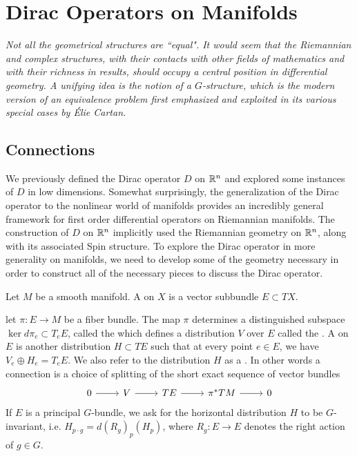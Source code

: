\chapter{Dirac Operators on Manifolds}
%
\subsectionend $ $\\
%
\emph{Not all the geometrical structures are ``equal". It would seem that the
 Riemannian and complex structures, with their contacts with other fields of
 mathematics and with their richness in results, should occupy a central position
 in differential geometry. A unifying idea is the notion of a $G$-structure, which
 is the modern version of an equivalence problem first emphasized and exploited
 in its various special cases by \'Elie Cartan.} \\
%
%
\subsectionend
%
\section{Connections}
%
We previously defined the Dirac operator $D$ on $\mathbb{R}^n$ and explored some
instances of $D$ in low dimensions. Somewhat surprisingly, the generalization
of the Dirac operator to the nonlinear world of manifolds provides an incredibly
general framework for first order differential operators on Riemannian manifolds.
The construction of $D$ on $\mathbb{R}^n$ implicitly used the
Riemannian geometry on $\mathbb{R}^n$, along with its associated Spin structure.
To explore the Dirac operator in more generality on manifolds, we need to
develop some of the geometry necessary in order to construct all of the necessary pieces
to discuss the Dirac operator.
%
\begin{defn}
Let $M$ be a smooth manifold. A  on $X$ is a vector subbundle
$E \subset TX$.
\end{defn}
%
\begin{defn}
let $\pi : E \to M$ be a fiber bundle. The map $\pi$ determines a distinguished
subspace $\ker d\pi_e \subset T_eE$, called the 
which defines a distribution $V$ over $E$ called the .
A  on $E$ is another distribution $H \subset TE$ such that
at every point $e \in E$, we have $V_e \oplus H_e = T_eE$. We also refer to the
distribution $H$ as a . In other words a connection
is a choice of splitting of the short exact sequence of vector bundles
\[\begin{tikzcd}
0 \ar[r] & V \ar[r] & TE \ar[r] & \pi^*TM \ar[r] & 0
\end{tikzcd}\]
If $E$ is a principal $G$-bundle, we ask for the horizontal distribution $H$
to be $G$-invariant, i.e. $H_{p \cdot g} = d(R_g)_p(H_p)$, where $R_g : E \to E$
denotes the right action of $g \in G$.
\end{defn}
